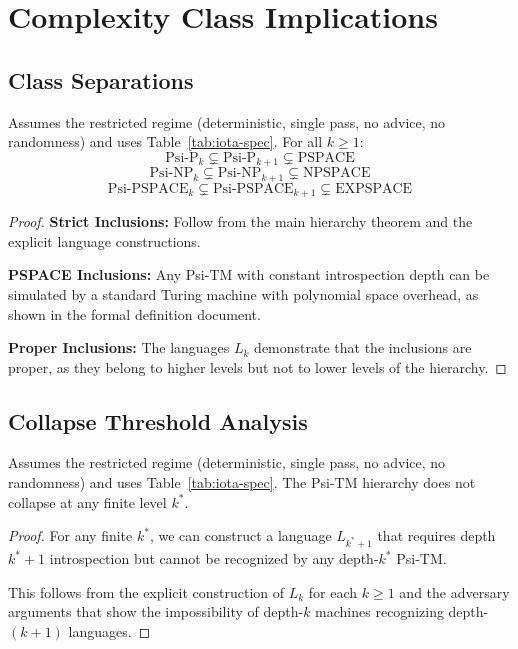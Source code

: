 \section{Complexity Class Implications}

\subsection{Class Separations}

\begin{theorem}
Assumes the restricted regime (deterministic, single pass, no advice, no randomness) and uses Table~\ref{tab:iota-spec}.
For all $k \geq 1$:
$$\text{Psi-P}_k \subsetneq \text{Psi-P}_{k+1} \subsetneq \text{PSPACE}$$
$$\text{Psi-NP}_k \subsetneq \text{Psi-NP}_{k+1} \subsetneq \text{NPSPACE}$$
$$\text{Psi-PSPACE}_k \subsetneq \text{Psi-PSPACE}_{k+1} \subsetneq \text{EXPSPACE}$$
\end{theorem}

\begin{proof}
\textbf{Strict Inclusions:}
Follow from the main hierarchy theorem and the explicit language constructions.

\textbf{PSPACE Inclusions:}
Any Psi-TM with constant introspection depth can be simulated by a standard Turing machine with polynomial space overhead, as shown in the formal definition document.

\textbf{Proper Inclusions:}
The languages $L_k$ demonstrate that the inclusions are proper, as they belong to higher levels but not to lower levels of the hierarchy.
\end{proof}

\subsection{Collapse Threshold Analysis}

\begin{theorem}
Assumes the restricted regime (deterministic, single pass, no advice, no randomness) and uses Table~\ref{tab:iota-spec}.
The Psi-TM hierarchy does not collapse at any finite level $k^*$.
\end{theorem}

\begin{proof}
For any finite $k^*$, we can construct a language $L_{k^*+1}$ that requires depth $k^*+1$ introspection but cannot be recognized by any depth-$k^*$ Psi-TM.

This follows from the explicit construction of $L_k$ for each $k \geq 1$ and the adversary arguments that show the impossibility of depth-$k$ machines recognizing depth-$(k+1)$ languages.
\end{proof}

